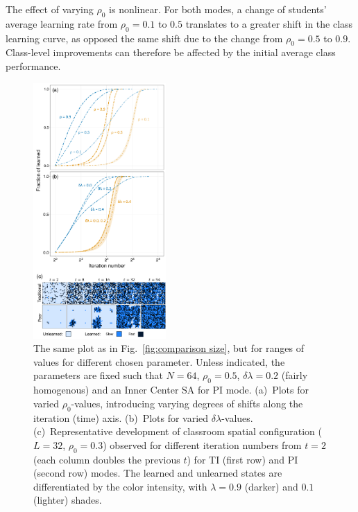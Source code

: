 \documentclass[twocolumn,secnumarabic,amssymb, nobibnotes, aps, prd]{revtex4-2}
\begin{document}
        The effect of varying $\rho_0$ is nonlinear.
        For both modes, a change of students' average learning rate from $\rho_0=0.1$ to $0.5$ translates to a greater shift in the class learning curve, as opposed the same shift due to the change from $\rho_0=0.5$ to $0.9$.
        Class-level improvements can therefore be affected by the initial average class performance.
        \begin{figure}[htbp]
        \centering
        \includegraphics[width=0.45\textwidth]{figures/figure4.png}
        \caption{
        The same plot as in Fig.~\ref{fig:comparison size}, but for ranges of values for different chosen parameter.
        Unless indicated, the parameters are fixed such that $N=64$, $\rho_0=0.5$, $\delta\lambda=0.2$ (fairly homogenous) and an Inner Center SA for PI mode.
        (a)~Plots for varied $\rho_0$-values, introducing varying degrees of shifts along the iteration (time) axis.
        (b)~Plots for varied $\delta\lambda$-values.
        (c)~Representative development of classroom spatial configuration ($L=32$, $\rho_0=0.3$) observed for different iteration numbers from $t=2$ (each column doubles the previous $t$) for TI (first row) and PI (second row) modes.
        The learned and unlearned states are differentiated by the color intensity, with $\lambda=0.9$ (darker) and $0.1$ (lighter) shades.
        }
        \label{fig:comparison rates}
        \end{figure}
\end{document}
